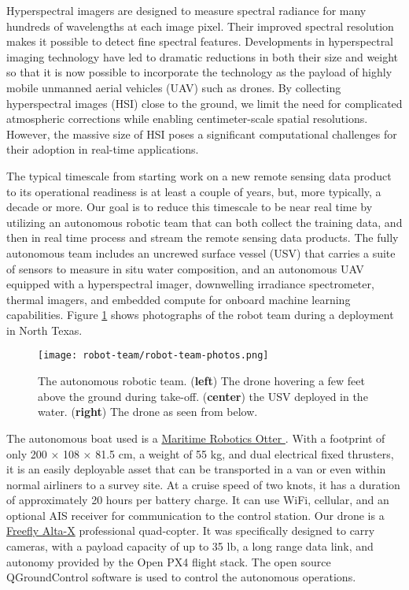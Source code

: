 Hyperspectral imagers are designed to measure spectral radiance for many
hundreds of wavelengths at each image pixel. Their improved spectral resolution
makes it possible to detect fine spectral features. Developments in
hyperspectral imaging technology have led to dramatic reductions in both their
size and weight so that it is now possible to incorporate the
technology as the payload of highly mobile unmanned aerial vehicles (UAV) such as
drones. By collecting hyperspectral images (HSI) close to the ground, we limit
the need for complicated atmospheric corrections while enabling centimeter-scale
spatial resolutions. However, the massive size of HSI poses a significant
computational challenges for their adoption in real-time
applications.

The typical timescale from starting work on a new remote sensing data
product to its operational readiness is at least a couple of years, but, more
typically, a decade or more. Our goal is to reduce this timescale to be near
real time by utilizing an autonomous robotic team that can both collect the
training data, and then in real time process and stream the remote sensing data
products. The fully autonomous team includes an uncrewed surface vessel (USV)
that carries a suite of sensors to measure in situ water composition,
and an autonomous UAV equipped with a hyperspectral imager, downwelling
irradiance spectrometer, thermal imagers, and embedded compute for onboard machine
learning capabilities. Figure \ref{fig:drone-team} shows photographs of the robot team
during a deployment in North Texas.

\begin{figure}[!hbt]
  \centering
  \texttt{[image: robot-team/robot-team-photos.png]}
  \caption{The autonomous robotic team. (\textbf{left}) The drone hovering a few
  feet above the ground during take-off. (\textbf{center}) the USV deployed in
  the water. (\textbf{right}) The drone as seen from below.}
  \label{fig:drone-team}
\end{figure}

The autonomous boat used is a
\href{https://www.maritimerobotics.com/otter}{Maritime Robotics Otter }. With a
footprint of only 200 × 108 × 81.5 cm, a weight of 55 kg, and dual electrical
fixed thrusters, it is an easily deployable asset that can be transported in a
van or even within normal airliners to a survey site. At a cruise speed of two
knots, it has a duration of approximately 20 hours per battery charge. It can use
WiFi, cellular, and an optional AIS receiver for communication to the control
station. Our drone is a \href{https://freeflysystems.com/alta-x}{Freefly Alta-X}
professional quad-copter. It was specifically designed to carry cameras, with a
payload capacity of up to 35 lb, a long range data link, and autonomy provided
by the Open PX4 flight stack. The open source QGroundControl software is used to
control the autonomous operations.

